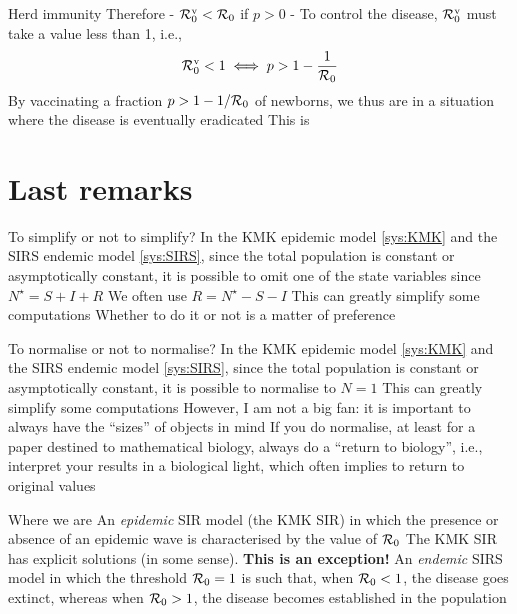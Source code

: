 \documentclass[aspectratio=43]{beamer}
\begin{document}
\begin{frame}{Herd immunity}
  Therefore 
  - $\mathcal{R}_0^{\textrm{v}}<\mathcal{R}_0$ if $p>0$
  - To control the disease, $\mathcal{R}_0^{\text{v}}$ must take a value less than 1, i.e.,
  \begin{equation}
    \mathcal{R}_0^{\text{v}}<1 \iff p> 1-\frac{1}{\mathcal{R}_0}
  \end{equation}
  \vfill
  By vaccinating a fraction $p>1-1/\mathcal{R}_0$ of newborns, we thus are in a situation where the disease is eventually eradicated
  \vfill
  This is 
\end{frame}


\section{Last remarks}

\begin{frame}{To simplify or not to simplify?}
\bbullet In the KMK epidemic model \eqref{sys:KMK} and the SIRS endemic model \eqref{sys:SIRS}, since the total population is constant or asymptotically constant, it is possible to omit one of the state variables since $N^\star=S+I+R$
\vfill
\bbullet We often use $R=N^\star-S-I$
\vfill
\bbullet This can greatly simplify some computations
\vfill
\bbullet Whether to do it or not is a matter of preference
\end{frame}

\begin{frame}{To normalise or not to normalise?}
\bbullet In the KMK epidemic model \eqref{sys:KMK} and the SIRS endemic model \eqref{sys:SIRS}, since the total population is constant or asymptotically constant, it is possible to normalise to $N=1$
\vfill
\bbullet This can greatly simplify some computations
\vfill
\bbullet However, I am not a big fan: it is important to always have the ``sizes'' of objects in mind
\vfill
\bbullet If you do normalise, at least for a paper destined to mathematical biology, always do a ``return to biology'', i.e., interpret your results in a biological light, which often implies to return to original values
\end{frame}

\begin{frame}{Where we are}
\bbullet An \emph{epidemic} SIR model (the KMK SIR) in which the presence or absence of an epidemic wave is characterised by the value of $\mathcal{R}_0$
\vfill
\bbullet The KMK SIR has explicit solutions (in some sense). \textbf{This is an exception!}
\vfill
\bbullet An \emph{endemic} SIRS model in which the threshold $\mathcal{R}_0=1$ is such that, when $\mathcal{R}_0<1$, the disease goes extinct, whereas when $\mathcal{R}_0>1$, the disease becomes established in the population
\end{frame}
\end{document}
